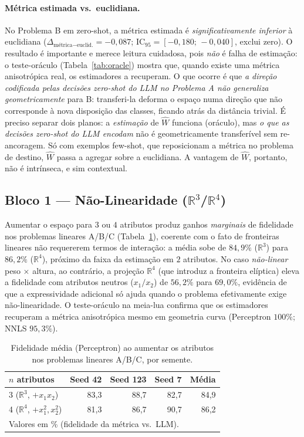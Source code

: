 \documentclass[12pt,a4paper]{article}
\newcommand{\West}{\ensuremath{\hat{W}}}   %
\begin{document}
\paragraph{Métrica estimada vs.\ euclidiana.}
No Problema B em zero-shot, a métrica estimada é \emph{significativamente inferior} à
euclidiana ($\Delta_{\text{métrica}-\text{euclid.}} = -0{,}087$;
IC$_{95} = [-0{,}180;\,-0{,}040]$, exclui zero). O resultado é importante e merece leitura
cuidadosa, pois \emph{não} é falha de estimação: o teste-oráculo
(Tabela~\ref{tab:oracle}) mostra que, quando existe uma métrica anisotrópica real, os
estimadores a recuperam. O que ocorre é que \emph{a direção codificada pelas decisões
zero-shot do LLM no Problema A não generaliza geometricamente} para B: transferi-la deforma
o espaço numa direção que não corresponde à nova disposição das classes, ficando atrás da
distância trivial. É preciso separar dois planos: a \emph{estimação} de \West{} funciona
(oráculo), mas \emph{o que as decisões zero-shot do LLM encodam} não é geometricamente
transferível sem re-ancoragem. Só com exemplos few-shot, que reposicionam a métrica no
problema de destino, \West{} passa a agregar sobre a euclidiana. A vantagem de \West{}, portanto,
não é intrínseca, e sim contextual.

\FloatBarrier

\subsection{Bloco 1 — Não-Linearidade (\texorpdfstring{$\mathbb{R}^3$/$\mathbb{R}^4$}{R3/R4})}

Aumentar o espaço para $3$ ou $4$ atributos produz ganhos \emph{marginais} de
fidelidade nos problemas lineares A/B/C (Tabela~\ref{tab:r3r4}), coerente com o fato de
fronteiras lineares não requererem termos de interação: a média sobe de $84{,}9\%$
($\mathbb{R}^3$)
para $86{,}2\%$ ($\mathbb{R}^4$), próximo da faixa da estimação em $2$ atributos. No caso
\emph{não-linear} peso $\times$ altura, ao contrário, a projeção $\mathbb{R}^4$ (que
introduz a
fronteira elíptica) eleva a fidelidade com atributos neutros ($x_1/x_2$) de
$56{,}2\%$ para $69{,}0\%$, evidência de que a expressividade adicional só ajuda quando o
problema efetivamente exige não-linearidade. O teste-oráculo na meia-lua confirma que os
estimadores recuperam a métrica anisotrópica mesmo em geometria curva (Perceptron $100\%$;
NNLS $95{,}3\%$).

\begin{table}[ht]
\centering
\caption{Fidelidade média (Perceptron) ao aumentar os atributos nos problemas lineares
A/B/C, por semente.}
\label{tab:r3r4}
\begin{tabular}{lrrrr}
\toprule
\textbf{$n$ atributos} & \textbf{Seed 42} & \textbf{Seed 123} & \textbf{Seed 7} &
\textbf{Média} \\
\midrule
3 ($\mathbb{R}^3$, $+x_1 x_2$)          & 83,3 & 88,7 & 82,7 & 84,9 \\
4 ($\mathbb{R}^4$, $+x_1^2,x_2^2$)      & 81,3 & 86,7 & 90,7 & 86,2 \\
\bottomrule
\multicolumn{5}{l}{\footnotesize Valores em \% (fidelidade da métrica vs.\ LLM).}
\end{tabular}
\end{table}
\end{document}
